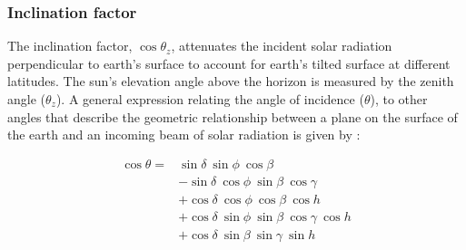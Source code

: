\subsubsection{Inclination factor}
\label{sec:cosz}
The inclination factor, $\cos \theta_z$, attenuates the incident solar radiation perpendicular to earth's surface to account for earth's tilted surface at different latitudes. 
The sun's elevation angle above the horizon is measured by the zenith angle ($\theta_z$). 
A general expression relating the angle of incidence ($\theta$), to other angles that describe the geometric relationship between a plane on the surface of the earth and an incoming beam of solar radiation is given by \parencite[Eq. 1.6.2]{duffie13}:

\begin{equation}
\label{eq:theta}
    \begin{split}
    	\cos \theta = & \sin\delta\: \sin\phi\: \cos\beta \\
            & - \sin\delta\: \cos\phi\: \sin\beta\: \cos\gamma \\
            & + \cos\delta\: \cos\phi\: \cos\beta\: \cos h \\
            & + \cos\delta\: \sin\phi\: \sin\beta\: \cos\gamma\: \cos h \\
            & + \cos\delta\: \sin\beta\: \sin\gamma\: \sin h
    \end{split}
\end{equation}

